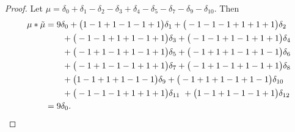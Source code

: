 \begin{proof}
Let $\mu = \delta_{0} +\delta_{1} - \delta_{2} - \delta_{3} +\delta_{4} - \delta_{5} - \delta_{7} - \delta_{9} - \delta_{10} 
$.  Then 
\begin{align*} 
\mu * \tilde \mu & = 9\delta_{0}   +  \big(1-1+1-1- 1 + 1\big)\delta_{1} 
 +  \big(  -1 - 1 - 1 + 1+ 1+ 1\big)\delta_{2} \\&\qquad  +  \big(  -1 - 1 + 1+1-1+ 1\big)\delta_{3} 
  +  \big(  -1 - 1 +1-1+ 1+ 1\big)\delta_{4} \\&\qquad  +  \big(  -1 +1-1+1-1+ 1\big)\delta_{5} 
   +  \big(  -1 + 1+1-1+1-1\big)\delta_{6} \\&\qquad  +  \big(  -1 +1-1- 1 + 1+ 1\big)\delta_{7} 
    +  \big(  -1 +1-1+1-1+ 1\big)\delta_{8} \\&\qquad  +  \big(1-1+ 1+1-1- 1 \big)\delta_{9} 
     +  \big(  -1 + 1+1-1+1-1\big)\delta_{10} \\&\qquad  +  \big(  -1 - 1 - 1 + 1+ 1+ 1\big)\delta_{11} \
    +  \big(1-1+1-1- 1 + 1\big)\delta_{12} 
\\&=9\delta_0.\qedhere
\end{align*}
\end{proof}
